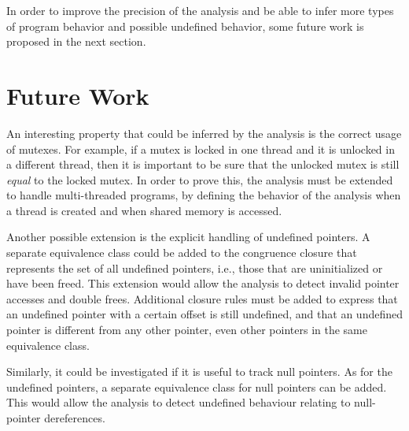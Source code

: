 In order to improve the precision of the analysis and be able to infer more types of program behavior and possible undefined behavior, some future work is proposed in the next section.

\section{Future Work}

An interesting property that could be inferred by the analysis is the correct usage of mutexes.
For example, if a mutex is locked in one thread and it is unlocked in a different thread, then it is important to be sure that the unlocked mutex is still \emph{equal} to the locked mutex.
In order to prove this, the analysis must be extended to handle multi-threaded programs, by defining the behavior of the analysis when a thread is created and when shared memory is accessed.

Another possible extension is the explicit handling of undefined pointers.
A separate equivalence class could be added to the congruence closure that represents the set of all undefined pointers, i.e., those that are uninitialized or have been freed.
This extension would allow the analysis to detect invalid pointer accesses and double frees.
Additional closure rules must be added to express that an undefined pointer with a certain offset is still undefined, and that an undefined pointer is different from any other pointer, even other pointers in the same equivalence class.

Similarly, it could be investigated if it is useful to track null pointers.
As for the undefined pointers, a separate equivalence class for null pointers can be added.
This would allow the analysis to detect undefined behaviour relating to null-pointer dereferences.
